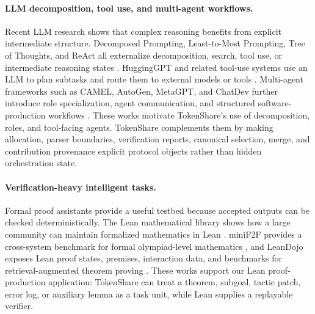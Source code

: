 \documentclass{article}
\theoremstyle{plain}
\begin{document}
\paragraph{LLM decomposition, tool use, and multi-agent workflows.}
{\color{blue}
Recent LLM research shows that complex reasoning benefits from explicit intermediate structure. Decomposed Prompting, Least-to-Most Prompting, Tree of Thoughts, and ReAct all externalize decomposition, search, tool use, or intermediate reasoning states \citep{khot2023decomposed,zhou2023least,yao2023tree,yao2023react}. HuggingGPT and related tool-use systems use an LLM to plan subtasks and route them to external models or tools \citep{shen2023hugginggpt}. Multi-agent frameworks such as CAMEL, AutoGen, MetaGPT, and ChatDev further introduce role specialization, agent communication, and structured software-production workflows \citep{li2023camel,wu2023autogen,hong2024metagpt,qian2023chatdev}. These works motivate TokenShare's use of decomposition, roles, and tool-facing agents. TokenShare complements them by making allocation, parser boundaries, verification reports, canonical selection, merge, and contribution provenance explicit protocol objects rather than hidden orchestration state.
}

\paragraph{Verification-heavy intelligent tasks.}
Formal proof assistants provide a useful testbed because accepted outputs can be checked deterministically. The Lean mathematical library shows how a large community can maintain formalized mathematics in Lean \citep{mathlib2020}. miniF2F provides a cross-system benchmark for formal olympiad-level mathematics \citep{zheng2021minif2f}, and LeanDojo exposes Lean proof states, premises, interaction data, and benchmarks for retrieval-augmented theorem proving \citep{yang2023leandojo}. These works support our Lean proof-production application: TokenShare can treat a theorem, subgoal, tactic patch, error log, or auxiliary lemma as a task unit, while Lean supplies a replayable verifier.
\end{document}
